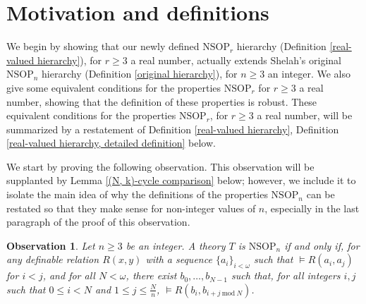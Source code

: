 \documentclass{amsart}
\newtheorem{observation}[theorem]{Observation}
\theoremstyle{definition}
\theoremstyle{remark}
\numberwithin{equation}{section}
\begin{document}
\section{Motivation and definitions}

We begin by showing that our newly defined $\mathrm{NSOP}_{r}$ hierarchy (Definition \ref{real-valued hierarchy}), for $r \geq 3$ a real number, actually extends Shelah's original $\mathrm{NSOP}_{n}$ hierarchy (Definition \ref{original hierarchy}), for $n \geq 3$ an integer. We also give some equivalent conditions for the properties $\mathrm{NSOP}_{r}$ for $r \geq 3$ a real number, showing that the definition of these properties is robust. These equivalent conditions for the properties $\mathrm{NSOP}_{r}$, for $r \geq 3$ a real number, will be summarized by a restatement of Definition \ref{real-valued hierarchy}, Definition \ref{real-valued hierarchy, detailed definition} below.

We start by proving the following observation. This observation will be supplanted by Lemma \ref{(N, k)-cycle comparison} below; however, we include it to isolate the main idea of why the definitions of the properties $\mathrm{NSOP}_{n}$ can be restated so that they make sense for non-integer values of $n$, especially in the last paragraph of the proof of this observation.

\begin{observation}\label{restatement of NSOP_n}
Let $n \geq 3$ be an integer. A theory $T$ is $\mathrm{NSOP}_{n}$ if and only if, for any definable relation $R(x, y)$ with a sequence $\{a_{i}\}_{i < \omega}$ such that $\models R(a_{i}, a_{j})$ for $i <j$, and for all $N < \omega$, there exist $b_{0}, \ldots, b_{N -1} $ such that, for all integers $i, j$ such that $0 \leq i <N$ and $1 \leq j \leq \frac{N}{n}$,  $\models R(b_{i}, b_{i+j \mathrm{\: mod \:} N})$.


\end{observation}
\end{document}
